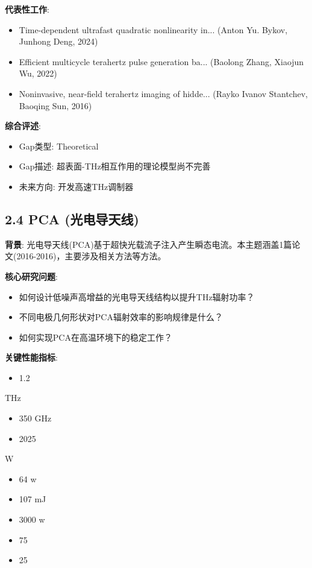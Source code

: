 \documentclass[12pt]{article}
\begin{document}
\textbf{代表性工作}:
\begin{itemize}
\item [1] Time-dependent ultrafast quadratic nonlinearity in... (Anton Yu. Bykov, Junhong Deng, 2024)
\item [2] Efficient multicycle terahertz pulse generation ba... (Baolong Zhang, Xiaojun Wu, 2022)
\item [3] Noninvasive, near-field terahertz imaging of hidde... (Rayko Ivanov Stantchev, Baoqing Sun, 2016)
\end{itemize}

\textbf{综合评述}:
\begin{itemize}
\item Gap类型: Theoretical
\item Gap描述: 超表面-THz相互作用的理论模型尚不完善
\item 未来方向: 开发高速THz调制器
\end{itemize}


\subsection{2.4 PCA (光电导天线)}

\textbf{背景}: 光电导天线(PCA)基于超快光载流子注入产生瞬态电流。本主题涵盖1篇论文(2016-2016)，主要涉及相关方法等方法。

\textbf{核心研究问题}:
\begin{itemize}
\item 如何设计低噪声高增益的光电导天线结构以提升THz辐射功率？
\item 不同电极几何形状对PCA辐射效率的影响规律是什么？
\item 如何实现PCA在高温环境下的稳定工作？
\end{itemize}

\textbf{关键性能指标}:
\begin{itemize}
\item 1.2
\end{itemize}
THz
\begin{itemize}
\item 350 GHz
\item 2025
\end{itemize}

W
\begin{itemize}
\item 64 w
\item 107 mJ
\item 3000 w
\item 75%
\item 25%
\end{itemize}
\end{document}
